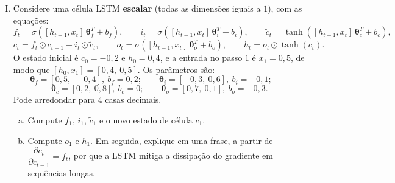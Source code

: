 \documentclass{dlproblemset}
\begin{document}
\begin{enumerate}[I)]
\item Considere uma célula LSTM \textbf{escalar} (todas as dimensões iguais a $1$), com as equações:
\[
f_t = \sigma([h_{t-1}, x_t]\,\boldsymbol{\theta}_f^{T} + b_f), \qquad
i_t = \sigma([h_{t-1}, x_t]\,\boldsymbol{\theta}_i^{T} + b_i), \qquad
\tilde{c}_t = \tanh([h_{t-1}, x_t]\,\boldsymbol{\theta}_c^{T} + b_c),
\]
\[
c_t = f_t \odot c_{t-1} + i_t \odot \tilde{c}_t, \qquad
o_t = \sigma([h_{t-1}, x_t]\,\boldsymbol{\theta}_o^{T} + b_o), \qquad
h_t = o_t \odot \tanh(c_t).
\]
O estado inicial é $c_0 = -0{,}2$ e $h_0 = 0{,}4$, e a entrada no passo $1$ é $x_1 = 0{,}5$, de modo que $[h_0, x_1] = [0{,}4,\ 0{,}5]$. Os parâmetros são:
\[
\boldsymbol{\theta}_f = [0{,}5,\ -0{,}4],\ b_f = 0{,}2; \qquad
\boldsymbol{\theta}_i = [-0{,}3,\ 0{,}6],\ b_i = -0{,}1; \qquad
\]
\[
\boldsymbol{\theta}_c = [0{,}2,\ 0{,}8],\ b_c = 0; \qquad
\boldsymbol{\theta}_o = [0{,}7,\ 0{,}1],\ b_o = -0{,}3.
\]
Pode arredondar para $4$ casas decimais.

\begin{enumerate}[(a)]
    \item Compute $f_1$, $i_1$, $\tilde{c}_1$ e o novo estado de célula $c_1$.
    \item Compute $o_1$ e $h_1$. Em seguida, explique em uma frase, a partir de $\dfrac{\partial c_t}{\partial c_{t-1}} = f_t$, por que a LSTM mitiga a dissipação do gradiente em sequências longas.
\end{enumerate}

\end{enumerate}
\end{document}
